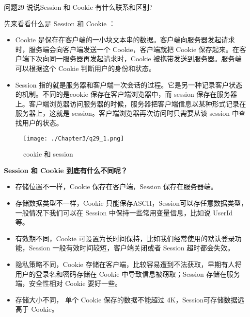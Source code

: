 \documentclass[cn,11pt,color=blue,lang=cn]{elegantbook}
\begin{document}
\begin{custom}{问题29}
说说Session 和 Cookie 有什么联系和区别?
\end{custom}
\begin{solution}
先来看看什么是 Session 和 Cookie ：

\begin{itemize}
	\item Cookie 是保存在客户端的一小块文本串的数据。客户端向服务器发起请求时，服务端会向客户端发送一个 Cookie，客户端就把 Cookie 保存起来。在客户端下次向同一服务器再发起请求时，Cookie 被携带发送到服务器。服务端可以根据这个 Cookie 判断用户的身份和状态。
	\item Session 指的就是服务器和客户端一次会话的过程。它是另一种记录客户状态的机制。不同的是cookie 保存在客户端浏览器中，而 session 保存在服务器上。客户端浏览器访问服务器的时候，服务器把客户端信息以某种形式记录在服务器上，这就是 session。客户端浏览器再次访问时只需要从该 session 中查找用户的状态。
\end{itemize}

\begin{figure}[htbp]
\centering
\texttt{[image: ./Chapter3/q29\_1.png]}
\caption{cookie 和 session}
\label{fig29_1}
\end{figure}

\begin{note} \textbf{Session 和 Cookie 到底有什么不同呢？} \end{note}
\begin{itemize}
	\item 存储位置不一样，Cookie 保存在客户端，Session 保存在服务器端。
	\item 存储数据类型不一样，Cookie 只能保存ASCII，Session可以存任意数据类型，一般情况下我们可以在 Session 中保持一些常用变量信息，比如说 UserId 等。
	\item 有效期不同，Cookie 可设置为长时间保持，比如我们经常使用的默认登录功能，Session 一般有效时间较短，客户端关闭或者 Session 超时都会失效。
	\item 隐私策略不同，Cookie 存储在客户端，比较容易遭到不法获取，早期有人将用户的登录名和密码存储在 Cookie 中导致信息被窃取；Session 存储在服务端，安全性相对 Cookie 要好一些。
	\item 存储大小不同， 单个 Cookie 保存的数据不能超过 4K，Session可存储数据远高于 Cookie。
\end{itemize}


\end{solution}
\end{document}
